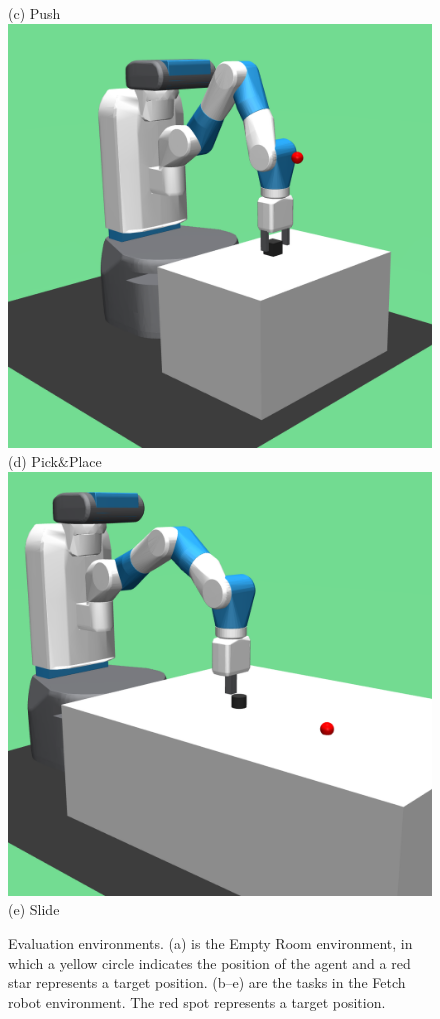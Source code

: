 \begin{figure}[t]
  ({c}) Push      
\endminipage\hfill
{}%
  \centering
  \includegraphics[width=\linewidth]{figures/chapter3/pick.png}
  ({d}) Pick$\&$Place
\endminipage\hfill
{}%
  \centering
  \includegraphics[width=\linewidth]{figures/chapter3/slide.png}
  ({e}) Slide     
\endminipage
\caption{Evaluation environments. ({a}) is the Empty Room environment, in which a yellow circle indicates the position of the agent and a red star represents a target position. ({b}--{e}) are the tasks in the Fetch robot environment. The red spot represents a target position.}
\label{fig:env}
\end{figure}

